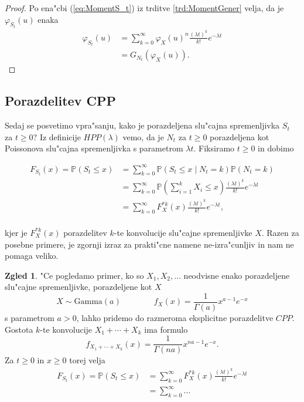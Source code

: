 \documentclass[12pt, a4paper, reqno]{amsart}
\theoremstyle{definition}
\newtheorem{zgled}[definicija]{Zgled}
\theoremstyle{plain}
\newcommand{\Prob}{\mathbb{P}}
\newcommand{\1}{\mathds{1}}
\begin{document}
    \begin{proof}
        Po ena"cbi (\ref{eq:MomentS_t}) iz trditve \ref{trd:MomentGener} velja, da je $\varphi_{S_t}(u)$ enaka
        \begin{align*}
            \varphi_{S_t}(u) &= \sum_{k=0}^{\infty}
            \varphi_X(u)^n\frac{(\lambda t)^k}{k!}e^{-\lambda t} \\
            &= G_{N_t}\left(\varphi_X(u)\right).
        \end{align*}
    \end{proof}

    \subsection{Porazdelitev CPP}
    Sedaj se posvetimo vpra"sanju, kako je porazdeljena slu"cajna spremenljivka $S_t$ za $t\geq 0$? 
    Iz definicije $HPP(\lambda)$ vemo, da je $N_t$ za $t\geq0$ porazdeljena kot Poissonova slu"cajna 
    spremenljivka s parametrom $\lambda t$. Fiksiramo $t\geq0$ in dobimo 

    \begin{align*}
        F_{S_t}(x) = \Prob(S_t \leq x) 
        &= \sum_{k=0}^\infty \Prob(S_t \leq x \mid N_t = k)\Prob(N_t = k) \\
        & = \sum_{k=0}^\infty \Prob(\sum_{i=1}^k X_i \leq x)\frac{(\lambda t)^k}{k!}e^{-\lambda t} \\
        & = \sum_{k=0}^\infty F_X^{*k}(x)\frac{(\lambda t)^k}{k!}e^{-\lambda t}, \\
    \end{align*}

    \noindent
    kjer je $F_X^{*k}(x)$ porazdelitev $k$-te konvolucije slu"cajne spremenljivke $X$. Razen za 
    posebne primere, je zgornji izraz za prakti"cne namene ne-izra"cunljiv in nam ne pomaga veliko.
    
    \begin{zgled}
        "Ce pogledamo primer, ko so $X_1, X_2, \dots$ neodvisne enako porazdeljene slu"cajne spremenljivke,
        porazdeljene kot $X$
        \begin{equation*}
            X\sim\text{Gamma}(a) \qquad \qquad f_X(x) = \frac{1}{\Gamma(a)}x^{a-1}e^{-x}
        \end{equation*}
        s parametrom $a>0$, lahko pridemo do razmeroma eksplicitne porazdelitve $CPP$. Gostota $k$-te 
        konvolucije $X_1 + \cdots + X_k$ ima formulo
        \begin{equation*}
            f_{X_1 + \cdots + X_k}(x) = \frac{1}{\Gamma(na)}x^{na-1}e^{-x}.
        \end{equation*}
        Za $t\geq 0$ in $x \geq 0$ torej velja
        \begin{align*}
            F_{S_t}(x) = \Prob(S_t \leq x)
            &= \sum_{k=0}^\infty F_X^{*k}(x)\frac{(\lambda t)^k}{k!}e^{-\lambda t}\\
            &= \sum_{k=0}^\infty 
            ...
        \end{align*}

        

    \end{zgled}
    
\end{document}
